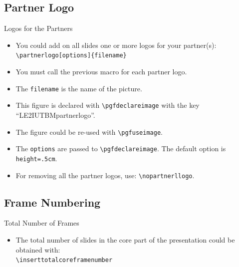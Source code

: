 \documentclass[english,sectioncirclenumberstyle]{le2iutbmbeamer}
\begin{document}
\subsection{Partner Logo}

\begin{frame}{Logos for the Partners}
	\begin{itemize}
	\item You could add on all slides one or more logos for your partner(s): \\
		\texttt{{\textbackslash}partnerlogo[options]\{filename\}}
	\item You must call the previous macro for each partner logo.
	\item The \texttt{filename} is the name of the picture.
	\vspace{1em}
	\item This figure is declared with \texttt{{\textbackslash}pgfdeclareimage} with the key ``LE2IUTBMpartnerlogo''.
	\item The figure could be re-used with \texttt{{\textbackslash}pgfuseimage}.
	\item The \texttt{options} are passed to \texttt{{\textbackslash}pgfdeclareimage}. The default option is \texttt{height=.5cm}.
	\item For removing all the partner logos, use: \texttt{{\textbackslash}nopartnerllogo}.
	\end{itemize}
\end{frame}



\subsection{Frame Numbering}

\begin{frame}{Total Number of Frames}
	\begin{itemize}
	\item The total number of slides in the core part of the presentation could be obtained with: \\
		\texttt{{\textbackslash}inserttotalcoreframenumber}
	\end{itemize}
\end{frame}
\end{document}
